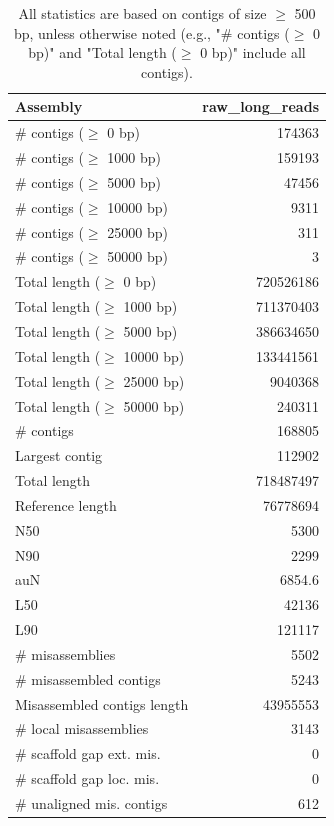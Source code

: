 \documentclass[12pt,a4paper]{article}
\begin{document}
\begin{table}[ht]
\begin{center}
\caption{All statistics are based on contigs of size $\geq$ 500 bp, unless otherwise noted (e.g., "\# contigs ($\geq$ 0 bp)" and "Total length ($\geq$ 0 bp)" include all contigs).}
\begin{tabular}{|l*{1}{|r}|}
\hline
Assembly & raw\_long\_reads \\ \hline
\# contigs ($\geq$ 0 bp) & 174363 \\ \hline
\# contigs ($\geq$ 1000 bp) & 159193 \\ \hline
\# contigs ($\geq$ 5000 bp) & 47456 \\ \hline
\# contigs ($\geq$ 10000 bp) & 9311 \\ \hline
\# contigs ($\geq$ 25000 bp) & 311 \\ \hline
\# contigs ($\geq$ 50000 bp) & 3 \\ \hline
Total length ($\geq$ 0 bp) & 720526186 \\ \hline
Total length ($\geq$ 1000 bp) & 711370403 \\ \hline
Total length ($\geq$ 5000 bp) & 386634650 \\ \hline
Total length ($\geq$ 10000 bp) & 133441561 \\ \hline
Total length ($\geq$ 25000 bp) & 9040368 \\ \hline
Total length ($\geq$ 50000 bp) & 240311 \\ \hline
\# contigs & 168805 \\ \hline
Largest contig & 112902 \\ \hline
Total length & 718487497 \\ \hline
Reference length & 76778694 \\ \hline
N50 & 5300 \\ \hline
N90 & 2299 \\ \hline
auN & 6854.6 \\ \hline
L50 & 42136 \\ \hline
L90 & 121117 \\ \hline
\# misassemblies & 5502 \\ \hline
\# misassembled contigs & 5243 \\ \hline
Misassembled contigs length & 43955553 \\ \hline
\# local misassemblies & 3143 \\ \hline
\# scaffold gap ext. mis. & 0 \\ \hline
\# scaffold gap loc. mis. & 0 \\ \hline
\# unaligned mis. contigs & 612 \\ \hline

\end{tabular}
\end{center}
\end{table}
\end{document}

